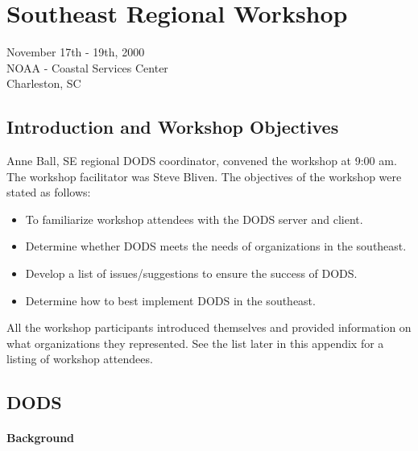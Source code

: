 \renewcommand{\chaptertitle}{Southeast Regional Workshop}
\chapter{\chaptertitle}


\begin{center}
November 17th - 19th, 2000\\
NOAA - Coastal Services Center\\
Charleston, SC\\
\end{center}

\section{Introduction and Workshop Objectives}

Anne Ball, SE regional DODS coordinator, convened the workshop at 9:00
am.  The workshop facilitator was Steve Bliven.  The objectives of the
workshop were stated as follows:

\begin{itemize}
  \item To familiarize workshop attendees with the DODS server and client.
  \item Determine whether DODS meets the needs of organizations in the southeast.
  \item Develop a list of issues/suggestions to ensure the success of DODS.
  \item Determine how to best implement DODS in the southeast.
\end{itemize}

All the workshop participants introduced themselves and provided
information on what organizations they represented.  See the list
later in this appendix for a listing of workshop attendees.

\section{DODS}

\subsubsection{Background}

